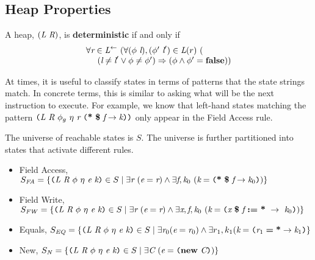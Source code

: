 \subsection{Heap Properties}


\begin{definition}
A heap, $(\emph{L}\ \emph{R})$, is \textbf{deterministic} if and only if 
\[
\begin{array}{l}
\forall \cfgnt{r} \in \cfgnt{L}^\leftarrow\ (\forall (\phi\ \cfgnt{l}),(\phi^\prime\ \cfgnt{l}^\prime) \in \cfgnt{L}(r)\ (\\
\ \ \ \ (\cfgnt{l} \neq \cfgnt{l}^\prime \vee \phi \neq \phi^\prime) \Rightarrow (\phi \wedge \phi^\prime = \cfgt{false}))
\end{array}
\]
\end{definition}

At times, it is useful to classify states in terms of patterns that the state strings match. In concrete terms, this is similar to asking what will be the next instruction to execute. For example, we know that left-hand states matching the pattern $ \lp \cfgnt{L}\ \cfgnt{R}\ \phi_g\ \eta\ \cfgnt{r}\ \lp \cfgt{*}\ \cfgt{\$}\ \cfgnt{f} \rightarrow \cfgnt{k}\rp \rp$ only appear in the Field Access rule.

\begin{definition}
The universe of reachable states is $S$. The universe is further partitioned into states that activate different rules.
\begin{itemize}
\item Field Access, $S_\mathit{FA} = \{\texttt{(} \emph{L}\ \emph{R}\ \phi\ \eta\ \emph{e}\ \emph{k} \texttt{)} \in S \mid \exists \emph{r}\ (\emph{e} = \emph{r}) \wedge \exists \emph{f},\emph{k}_0\ (\emph{k} = \texttt{(} \textbf{*}\ \textbf{\$}\ \emph{f} \rightarrow \emph{k}_0\texttt{)}) \}$
\item Field Write,  $S_\mathit{FW} = \{\lp \cfgnt{L}\ \cfgnt{R}\ \phi\ \eta\ \cfgnt{e}\ \cfgnt{k} \rp \in S \mid \exists \cfgnt{r}\ (\cfgnt{e} = \cfgnt{r}) \wedge \exists \cfgnt{x},\cfgnt{f},\cfgnt{k}_0\ (\cfgnt{k} = \lp \cfgnt{x}\ \cfgt{\$}\ \cfgnt{f}\ \cfgt{:=}\ \cfgt{*}\ \rightarrow\ \cfgnt{k}_0\rp) \}$
\item Equals, $S_\mathit{EQ} = \{\texttt{(} \emph{L}\ \emph{R}\ \phi\ \eta\ \emph{e}\ \emph{k} \texttt{)} \in S \mid \exists \emph{r}_0 (\emph{e} = \emph{r}_0) \wedge \exists r_1, k_1(\emph{k} = \texttt{(} \emph{r}_1\; \textbf{=}\; \textbf{*} \rightarrow \emph{k}_1\texttt{)} \}$
\item New, $S_\mathit{N} = \{\lp \cfgnt{L}\ \cfgnt{R}\ \phi\ \eta\ \cfgnt{e}\ \cfgnt{k} \rp \in S \mid \exists \cfgnt{C}\ (\cfgnt{e} = \lp \cfgt{new}\ \cfgnt{C}\rp) \}$
\end{itemize} 
\end{definition}


